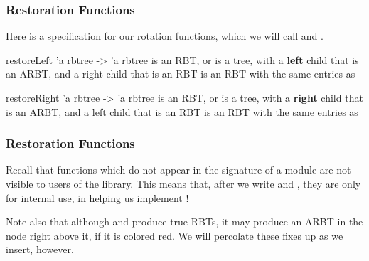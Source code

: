 \documentclass[aspectratio=169, handout]{beamer}
\begin{document}
\begin{frame}
  \frametitle{Restoration Functions}

  Here is a specification for our rotation functions, which we will call
   and .

  \pause
  \spec
    {restoreLeft}
    {'a rbtree -> 'a rbtree}
    { is an RBT, or  is a  tree, with a \textbf{left}
    child that is an ARBT, and a right child that is an RBT}
    { is an RBT with the same entries as }

  \pause
  \spec
    {restoreRight}
    {'a rbtree -> 'a rbtree}
    { is an RBT, or  is a  tree, with a \textbf{right}
    child that is an ARBT, and a left child that is an RBT}
    { is an RBT with the same entries as }
\end{frame}

\begin{frame}
  \frametitle{Restoration Functions}

  Recall that functions which do not appear in the signature of a module
  are not visible to users of the library. This means that, after we
  write  and , they are only for
  internal use, in helping us implement !

  \pause
  \vspace{\fill}

  Note also that although  and  produce
  true RBTs, it may produce an ARBT in the node right above it, if it is
  colored red. We will percolate these fixes up as we insert, however.
\end{frame}
\end{document}
